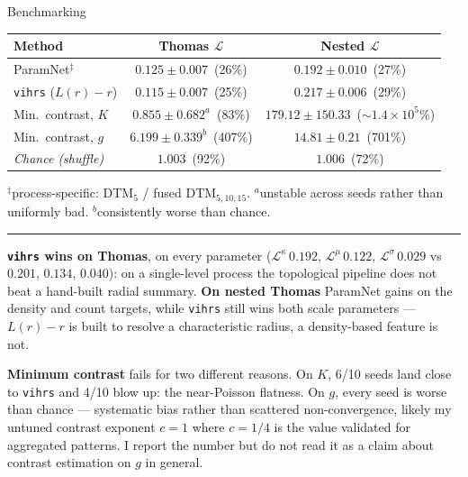 \documentclass[aspectratio=169,10pt]{beamer}
\newcommand{\Loss}{\mathcal{L}}
\newcommand{\DTM}{\mathrm{DTM}}
\begin{document}
\begin{frame}{Benchmarking}
\centering\footnotesize
\begin{tabular}{lcc}
\toprule
Method & Thomas $\Loss$ & Nested $\Loss$ \\
\midrule
ParamNet$^{\ddagger}$     & $0.125 \pm 0.007$~{\scriptsize(26\%)}      & $\mathbf{0.192 \pm 0.010}$~{\scriptsize(27\%)} \\
\texttt{vihrs} ($L(r)-r$) & $\mathbf{0.115 \pm 0.007}$~{\scriptsize(25\%)} & $0.217 \pm 0.006$~{\scriptsize(29\%)} \\
Min.\ contrast, $K$       & $0.855 \pm 0.682^{a}$~{\scriptsize(83\%)}  & $179.12 \pm 150.33$~{\scriptsize($\sim\!1.4{\times}10^{5}$\%)} \\
Min.\ contrast, $g$       & $6.199 \pm 0.339^{b}$~{\scriptsize(407\%)} & $14.81 \pm 0.21$~{\scriptsize(701\%)} \\
\midrule
\emph{Chance (shuffle)}   & \emph{$1.003$}~{\scriptsize(92\%)}         & \emph{$1.006$}~{\scriptsize(72\%)} \\
\bottomrule
\end{tabular}

\vspace{4pt}
{\raggedright\scriptsize
$^{\ddagger}$process-specific: $\DTM_5$ / fused $\DTM_{5,10,15}$.
$^{a}$unstable across seeds rather than uniformly bad.
$^{b}$consistently worse than chance.\par}

\vspace{8pt}
\hrule
\vspace{5pt}

{\raggedright\footnotesize
\textbf{\texttt{vihrs} wins on Thomas}, on every parameter
($\Loss^\kappa\,0.192$, $\Loss^\mu\,0.122$, $\Loss^\sigma\,0.029$ vs
$0.201$, $0.134$, $0.040$): on a single-level process the topological pipeline
does not beat a hand-built radial summary.
\textbf{On nested Thomas} ParamNet gains on the density and count targets, while
\texttt{vihrs} still wins both scale parameters --- $L(r)-r$ is built to resolve
a characteristic radius, a density-based feature is not.
\vspace{4pt}

\textbf{Minimum contrast} fails for two different reasons. On $K$, 6/10 seeds
land close to \texttt{vihrs} and 4/10 blow up: the near-Poisson flatness. On
$g$, every seed is worse than chance --- systematic bias rather than scattered
non-convergence, likely my untuned contrast exponent $c=1$ where $c=1/4$ is the
value validated for aggregated patterns. I report the number but do not read it
as a claim about contrast estimation on $g$ in general.\par}
\end{frame}
\end{document}
